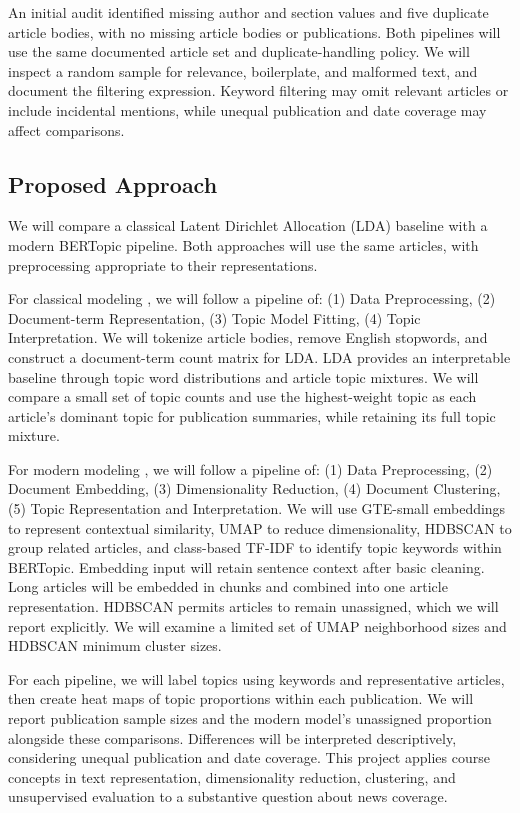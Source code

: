 \documentclass{article}
\begin{document}
An initial audit identified missing author and section values and five duplicate article bodies, with no missing article bodies or publications. Both pipelines will use the same documented article set and duplicate-handling policy. We will inspect a random sample for relevance, boilerplate, and malformed text, and document the filtering expression. Keyword filtering may omit relevant articles or include incidental mentions, while unequal publication and date coverage may affect comparisons.


\subsection*{Proposed Approach}
We will compare a classical Latent Dirichlet Allocation (LDA) baseline with a modern BERTopic pipeline. Both approaches will use the same articles, with preprocessing appropriate to their representations.

For classical modeling \parencite{qamar2024}, we will follow a pipeline of: (1) Data Preprocessing, (2) Document-term Representation, (3) Topic Model Fitting, (4) Topic Interpretation. We will tokenize article bodies, remove English stopwords, and construct a document-term count matrix for LDA. LDA provides an interpretable baseline through topic word distributions and article topic mixtures. We will compare a small set of topic counts and use the highest-weight topic as each article's dominant topic for publication summaries, while retaining its full topic mixture.

For modern modeling \parencite{alammar2024, kumari2026}, we will follow a pipeline of: (1) Data Preprocessing, (2) Document Embedding, (3) Dimensionality Reduction, (4) Document Clustering, (5) Topic Representation and Interpretation. We will use GTE-small embeddings to represent contextual similarity, UMAP to reduce dimensionality, HDBSCAN to group related articles, and class-based TF-IDF to identify topic keywords within BERTopic. Embedding input will retain sentence context after basic cleaning. Long articles will be embedded in chunks and combined into one article representation. HDBSCAN permits articles to remain unassigned, which we will report explicitly. We will examine a limited set of UMAP neighborhood sizes and HDBSCAN minimum cluster sizes.

For each pipeline, we will label topics using keywords and representative articles, then create heat maps of topic proportions within each publication. We will report publication sample sizes and the modern model's unassigned proportion alongside these comparisons. Differences will be interpreted descriptively, considering unequal publication and date coverage. This project applies course concepts in text representation, dimensionality reduction, clustering, and unsupervised evaluation to a substantive question about news coverage.
\end{document}
